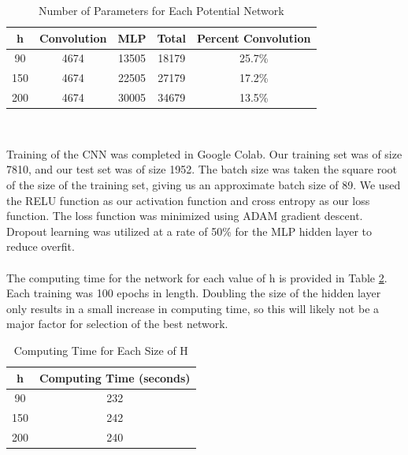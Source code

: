 \documentclass{homework}
\begin{document}
\begin{table}[h]
    \centering
    {\begin{tabular}{c|ccc|c}
         h&Convolution&MLP&Total&Percent Convolution\\
         \hline
         90&4674&13505&18179&25.7\%\\
         150&4674&22505&27179&17.2\%\\
         200&4674&30005&34679&13.5\%\\
    \end{tabular}}\\
    \caption{Number of Parameters for Each Potential Network}
    \label{parameters}
\end{table}

Training of the CNN was completed in Google Colab. Our training set was of size 7810, and our test set was of size 1952. The batch size was taken the square root of the size of the training set, giving us an approximate batch size of 89. We used the RELU function as our activation function and cross entropy as our loss function. The loss function was minimized using ADAM gradient descent. Dropout learning was utilized at a rate of 50\% for the MLP hidden layer to reduce overfit.\\\\
The computing time for the network for each value of h is provided in Table \ref{computing}. Each training was 100 epochs in length. Doubling the size of the hidden layer only results in a small increase in computing time, so this will likely not be a major factor for selection of the best network.

\begin{table}[h]
    \centering
    {\begin{tabular}{c|c}
         h&Computing Time (seconds)\\
         \hline
         90&232\\
         150&242\\
         200&240\\
    \end{tabular}}\\
    \caption{Computing Time for Each Size of H}
    \label{computing}
\end{table}
\end{document}
